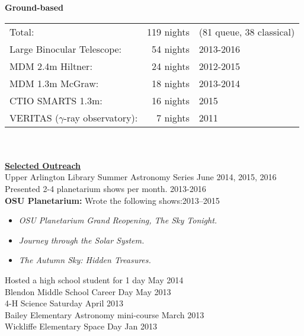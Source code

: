 \documentclass[letterpaper,11pt]{article}
\begin{document}
\textbf{Ground-based}\\
\begin{tabular}[t]{lrl}
Total:&                                        119 nights& (81 queue, 38 classical)\\
Large Binocular Telescope:&       54 nights& 2013-2016\\
MDM 2.4m Hiltner:&                   24 nights& 2012-2015\\
MDM 1.3m McGraw: &               18 nights& 2013-2014\\
CTIO SMARTS 1.3m: &              16 nights& 2015\\
VERITAS ($\gamma$-ray observatory): &   7 nights& 2011   \\ 
\end{tabular}
\\
\\


\noindent\underline{\textbf{Selected Outreach}}\\
Upper Arlington Library Summer Astronomy Series \hfill June 2014, 2015, 2016\\
Presented 2-4 planetarium shows per month. \hfill 2013-2016\\
\textbf{OSU Planetarium:} Wrote the following shows:\hfill2013--2015
\begin{itemize}[nosep,label=\textbullet]
\item \textit{OSU Planetarium Grand Reopening, The Sky Tonight.}
\item \textit{Journey through the Solar System.}
\item \textit{The Autumn Sky:  Hidden Treasures.}
\end{itemize}
\noindent Hosted a high school student for 1 day \hfill May 2014\\
Blendon Middle School Career Day \hfill  May 2013\\
4-H Science Saturday \hfill April 2013\\
Bailey Elementary Astronomy mini-course \hfill March 2013\\
Wickliffe Elementary Space Day \hfill  Jan 2013\\
\end{document}

